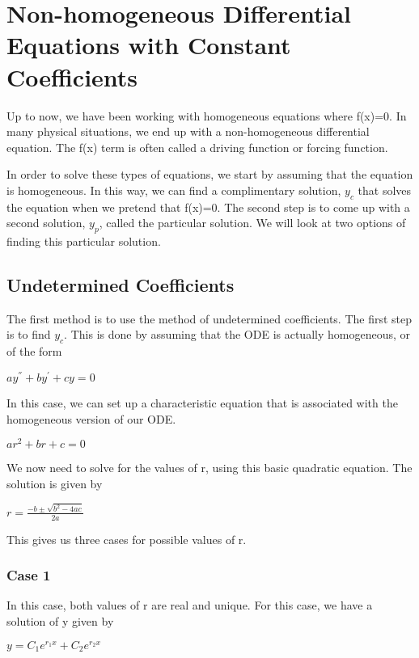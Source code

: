 \documentclass[
  letterpaper,
]{report}
\begin{document}
\section{Non-homogeneous Differential Equations with Constant
Coefficients}\label{non-homogeneous-differential-equations-with-constant-coefficients}

Up to now, we have been working with homogeneous equations where f(x)=0.
In many physical situations, we end up with a non-homogeneous
differential equation. The f(x) term is often called a driving function
or forcing function.

In order to solve these types of equations, we start by assuming that
the equation is homogeneous. In this way, we can find a complimentary
solution, \(y_c\) that solves the equation when we pretend that f(x)=0.
The second step is to come up with a second solution, \(y_p\), called
the particular solution. We will look at two options of finding this
particular solution.

\subsection{Undetermined Coefficients}\label{undetermined-coefficients}

The first method is to use the method of undetermined coefficients. The
first step is to find \(y_c\). This is done by assuming that the ODE is
actually homogeneous, or of the form

\(a y^{''} + b y^{'} + c y = 0\)

In this case, we can set up a characteristic equation that is associated
with the homogeneous version of our ODE.

\(a r^2 + b r + c = 0\)

We now need to solve for the values of r, using this basic quadratic
equation. The solution is given by

\(r = \frac{-b \pm \sqrt{b^2 - 4 a c}}{2 a}\)

This gives us three cases for possible values of r.

\subsubsection{Case 1}\label{case-1-1}

In this case, both values of r are real and unique. For this case, we
have a solution of y given by

\(y = C_1 e^{r_1 x} + C_2 e^{r_2 x}\)
\end{document}

